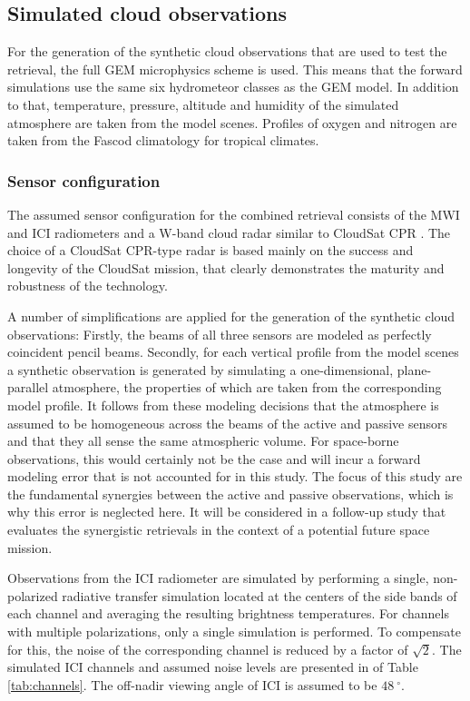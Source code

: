 \documentclass[journal abbreviation, manuscript]{copernicus}
\begin{document}
\subsection{Simulated cloud observations}

For the generation of the synthetic cloud observations that are used to test the
retrieval, the full GEM microphysics scheme is used. This means that the forward
simulations use the same six hydrometeor classes as the GEM model. In addition to
that, temperature, pressure, altitude and humidity of the simulated atmosphere
are taken from the model scenes. Profiles of oxygen and nitrogen are taken from
the Fascod climatology for tropical climates.

\subsubsection{Sensor configuration}
\label{sec:sensors}

The assumed sensor configuration for the combined retrieval consists of the
MWI and ICI radiometers and a W-band cloud radar similar to CloudSat CPR
\citep{stephens02,tanelli08}. The choice of a CloudSat CPR-type radar is based
mainly on the success and longevity of the CloudSat mission, that clearly
demonstrates the maturity and robustness of the technology.

A number of simplifications are applied for the generation of the synthetic
cloud observations: Firstly, the beams of all three sensors are modeled as
perfectly coincident pencil beams. Secondly, for each vertical profile from the
model scenes a synthetic observation is generated by simulating a
one-dimensional, plane-parallel atmosphere, the properties of which are taken
from the corresponding model profile. It follows from these modeling decisions
that the atmosphere is assumed to be homogeneous across the beams of the active
and passive sensors and that they all sense the same atmospheric volume. For
space-borne observations, this would certainly not be the case and will incur a
forward modeling error that is not accounted for in this study. The focus of
this study are the fundamental synergies between the active and passive
observations, which is why this error is neglected here. It will be considered
in a follow-up study that evaluates the synergistic retrievals in the context of
a potential future space mission.

Observations from the ICI radiometer are simulated by performing a single,
non-polarized radiative transfer simulation located at the centers of the side
bands of each channel and averaging the resulting brightness temperatures. For
channels with multiple polarizations, only a single simulation is performed.
To compensate for this, the noise of the corresponding channel is reduced by a
factor of $\sqrt{2}$. The simulated ICI channels and assumed noise levels are
presented in  of Table \ref{tab:channels}. The off-nadir viewing angle of ICI
is assumed to be $48\ \unit{^\circ}$.
\end{document}
